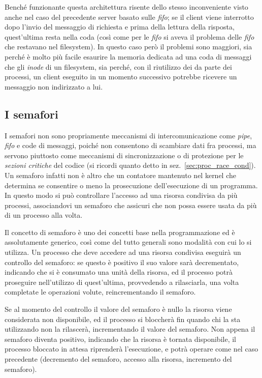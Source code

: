 Benché funzionante questa architettura risente dello stesso inconveniente
visto anche nel caso del precedente server basato sulle \textit{fifo}; se il
client viene interrotto dopo l'invio del messaggio di richiesta e prima della
lettura della risposta, quest'ultima resta nella coda (così come per le
\textit{fifo} si aveva il problema delle \textit{fifo} che restavano nel
filesystem). In questo caso però il problemi sono maggiori, sia perché è molto
più facile esaurire la memoria dedicata ad una coda di messaggi che gli
\textit{inode} di un filesystem, sia perché, con il riutilizzo dei 
da parte dei processi, un client eseguito in un momento successivo potrebbe
ricevere un messaggio non indirizzato a lui.


\subsection{I semafori}
\label{sec:ipc_sysv_sem}

I semafori non sono propriamente meccanismi di intercomunicazione come
\textit{pipe}, \textit{fifo} e code di messaggi, poiché non consentono di
scambiare dati fra processi, ma servono piuttosto come meccanismi di
sincronizzazione o di protezione per le \textsl{sezioni critiche} del codice
(si ricordi quanto detto in sez.~\ref{sec:proc_race_cond}).  Un semaforo
infatti non è altro che un contatore mantenuto nel kernel che determina se
consentire o meno la prosecuzione dell'esecuzione di un programma. In questo
modo si può controllare l'accesso ad una risorsa condivisa da più processi,
associandovi un semaforo che assicuri che non possa essere usata da più di un
processo alla volta.

Il concetto di semaforo è uno dei concetti base nella programmazione ed è
assolutamente generico, così come del tutto generali sono modalità con cui lo
si utilizza. Un processo che deve accedere ad una risorsa condivisa eseguirà
un controllo del semaforo: se questo è positivo il suo valore sarà
decrementato, indicando che si è consumato una unità della risorsa, ed il
processo potrà proseguire nell'utilizzo di quest'ultima, provvedendo a
rilasciarla, una volta completate le operazioni volute, reincrementando il
semaforo.

Se al momento del controllo il valore del semaforo è nullo la risorsa viene
considerata non disponibile, ed il processo si bloccherà fin quando chi la sta
utilizzando non la rilascerà, incrementando il valore del semaforo. Non appena
il semaforo diventa positivo, indicando che la risorsa è tornata disponibile,
il processo bloccato in attesa riprenderà l'esecuzione, e potrà operare come
nel caso precedente (decremento del semaforo, accesso alla risorsa, incremento
del semaforo).

